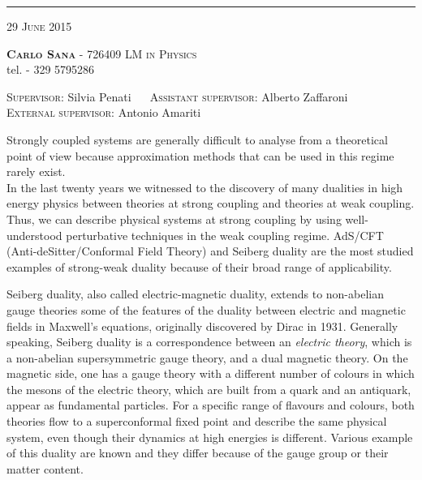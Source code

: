 \documentclass[a4paper,11pt]{article}
\date{}
\title{ \textbf{\boldmath{4D to 3D reduction of Seiberg duality for $SU(N)$ susy gauge theories with adjoint matter: a partition function approach }}	}
\author{}
\begin{document}
\maketitle
\vspace*{-2.3cm}
\begin{center}
\rule{\textwidth}{0.6pt}
\textsc {29 June 2015} \\
 \end{center}
\vspace{-0.3cm}
	 \textbf{\noindent%
	 \scshape%
	 Carlo Sana} - \textsf{726409}  \hfill
 {\scshape LM in Physics} 
\\
\noindent  tel. \textsf{- 329 5795286}\\
\vspace{-0.5cm}
\begin{center}
{\scshape Supervisor}: 
\textsf{Silvia Penati} 
~~
{\scshape Assistant supervisor}:
\textsf{Alberto Zaffaroni}
\\
{\scshape External supervisor}:
\textsf{Antonio Amariti}

\end{center}



Strongly coupled systems are generally difficult to analyse from a theoretical point of view because approximation methods that can be used in this regime rarely exist.\\
In the last twenty years we witnessed to the discovery of many dualities in high energy physics between theories at strong coupling and theories at weak coupling.
Thus, we can describe physical systems at strong coupling by using well-understood perturbative techniques in the weak coupling regime. 
AdS/CFT (Anti-deSitter/Conformal Field Theory) and Seiberg duality are the most studied examples of strong-weak duality because of their broad range of applicability.

Seiberg duality, also called electric-magnetic duality, extends to non-abelian gauge theories some of the features of the duality between electric and magnetic fields in Maxwell's equations, originally discovered by Dirac in 1931.
Generally speaking, Seiberg duality is a correspondence between an \emph{electric theory}, which is a non-abelian supersymmetric gauge theory, and a dual magnetic theory. 
On the magnetic side, one has a gauge theory with a different number of colours  in which the mesons of the electric theory, which are built from a quark and an antiquark, appear as fundamental particles.
For a specific range of flavours and colours, both theories flow to a superconformal fixed point and describe the same physical system, even though their dynamics at high energies is different.
Various example of this duality are known and they differ because of the gauge group or their matter content.
\end{document}
